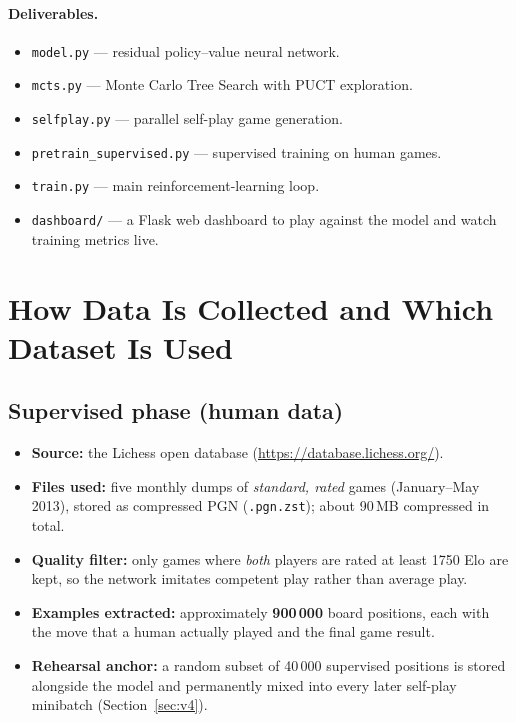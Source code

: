 \documentclass[11pt,a4paper]{article}
\begin{document}
\paragraph{Deliverables.}
\begin{itemize}
  \item \texttt{model.py} --- residual policy--value neural network.
  \item \texttt{mcts.py} --- Monte Carlo Tree Search with PUCT exploration.
  \item \texttt{selfplay.py} --- parallel self-play game generation.
  \item \texttt{pretrain\_supervised.py} --- supervised training on human games.
  \item \texttt{train.py} --- main reinforcement-learning loop.
  \item \texttt{dashboard/} --- a Flask web dashboard to play against the model
        and watch training metrics live.
\end{itemize}

\section{How Data Is Collected and Which Dataset Is Used}

\subsection{Supervised phase (human data)}
\begin{itemize}
  \item \textbf{Source:} the Lichess open database
        (\url{https://database.lichess.org/}).
  \item \textbf{Files used:} five monthly dumps of \emph{standard, rated} games
        (January--May 2013), stored as compressed PGN (\texttt{.pgn.zst});
        about 90\,MB compressed in total.
  \item \textbf{Quality filter:} only games where \emph{both} players are
        rated at least 1750 Elo are kept, so the network imitates competent
        play rather than average play.
  \item \textbf{Examples extracted:} approximately \textbf{900\,000}
        board positions, each with the move that a human actually played and
        the final game result.
  \item \textbf{Rehearsal anchor:} a random subset of 40\,000 supervised
        positions is stored alongside the model and permanently mixed into
        every later self-play minibatch (Section~\ref{sec:v4}).
\end{itemize}
\end{document}
